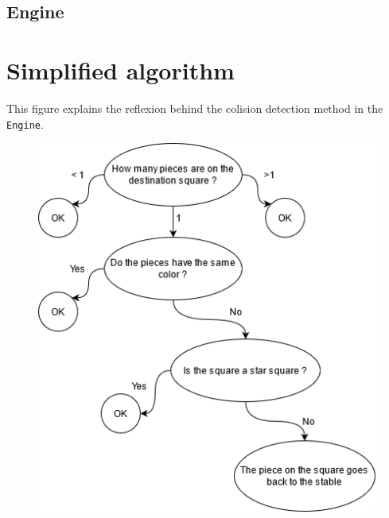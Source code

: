 \documentclass[english, 11pt, titlepage]{article}
\begin{document}
    \subsection{Engine}

    \pagebreak
    \section{Simplified algorithm}
    \label{app:algorithm}
    This figure explains the reflexion behind the colision detection method in the \verb|Engine|.
    \begin{figure}[h]
        \centering
        \vspace{0.3cm}
        \includegraphics{Logigram.png}
    \end{figure}
    
\end{document}
